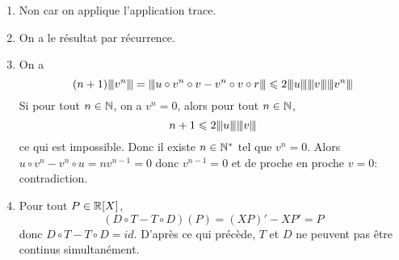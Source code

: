 \begin{solution}
	\phantom{}
	\begin{enumerate}
		\item Non car on applique l'application trace.
		\item On a le résultat par récurrence.
		\item On a 
		$$(n+1)\vertiii{v^{n}}=\vertiii{u\circ v^{n}\circ v-v^{n}\circ v\circ r}\leqslant 2\vertiii{u}\vertiii{v}\vertiii{v^{n}}$$
		Si pour tout $n\in\mathbb{N}$, on a $v^{n}=0$, alors pour tout $n\in\mathbb{N}$,
		$$n+1\leqslant 2{\left\vert\kern-0.25ex\left\vert\kern-0.25ex\left\vert{}u \right\vert\kern-0.25ex\right\vert\kern-0.25ex\right\vert}{\left\vert\kern-0.25ex\left\vert\kern-0.25ex\left\vert{}v \right\vert\kern-0.25ex\right\vert\kern-0.25ex\right\vert}$$
		ce qui est impossible. Donc il existe $n\in\mathbb{N}^{*}$ tel que $v^{n}=0$. Alors $u\circ v^{n}-v^{n}\circ u=nv^{n-1}=0$ donc $v^{n-1}=0$ et de proche en proche $v=0$: contradiction.
		\item Pour tout $P\in\mathbb{R}[X]$, 
		$$(D\circ T-T\circ D)(P)=(XP)'-XP'=P$$
		donc $D\circ T-T\circ D=id$. D'après ce qui précède, $T$ et $D$ ne peuvent pas être continus simultanément.
	\end{enumerate}
\end{solution}

